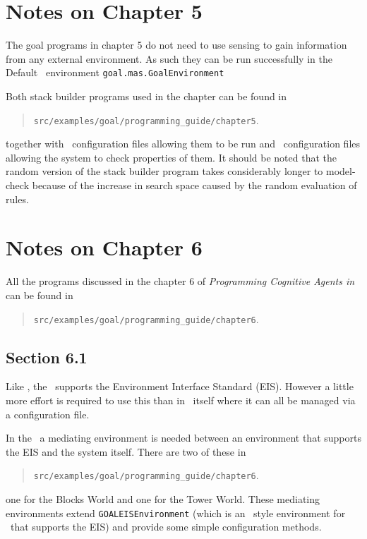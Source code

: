 \documentclass[a4]{article}
\begin{document}
\section{Notes on Chapter 5}
The goal programs in chapter 5 do not need to use sensing to gain information from any external environment.  As such they can be run successfully in the Default \goal\ environment \texttt{goal.mas.GoalEnvironment}

Both stack builder programs used in the chapter can be found in
\begin{quote}
  \texttt{src/examples/goal/programming\_guide/chapter5}.
\end{quote}
together with \ail\ configuration files allowing them to be run and \ajpf\ configuration files allowing the system to check properties of them.  It should be noted that the random version of the stack builder program takes considerably longer to model-check because of the increase in search space caused by the random evaluation of rules.

\section{Notes on Chapter 6}

All the programs discussed in the chapter 6 of \emph{Programming Cognitive Agents in \goal} can be found in
\begin{quote}
  \texttt{src/examples/goal/programming\_guide/chapter6}.
\end{quote}

\subsection{Section 6.1}
Like \goal, the \ail\ supports the Environment Interface Standard (EIS).  However a little more effort is required to use this than in \goal\ itself where it can all be managed via a configuration file.

In the \ail\ a mediating environment is needed between an environment that supports the EIS and the system itself.  There are two of these in 
\begin{quote}
  \texttt{src/examples/goal/programming\_guide/chapter6}.
\end{quote}
one for the Blocks World and one for the Tower World.  These mediating environments extend \texttt{GOALEISEnvironment} (which is an \ail\ style environment for \goal\ that supports the EIS) and provide some simple configuration methods.
\end{document}
